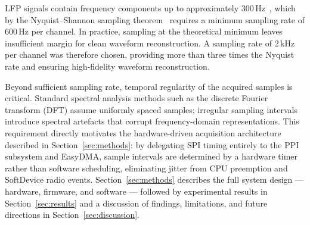 LFP signals contain frequency components up to approximately
300\,Hz~\cite{reimann2013biophysically, thielen2023making}, which by the Nyquist--Shannon
sampling theorem~\cite{shannon1949} requires a minimum sampling rate
of 600\,Hz per channel. In practice, sampling at the theoretical minimum
leaves insufficient margin for clean waveform reconstruction. A sampling
rate of 2\,kHz per channel was therefore chosen, providing more than
three times the Nyquist rate and ensuring high-fidelity waveform
reconstruction.

Beyond sufficient sampling rate, temporal regularity of the acquired
samples is critical. Standard spectral analysis methods such as the
discrete Fourier transform (DFT) assume uniformly spaced samples;
irregular sampling intervals introduce spectral artefacts that corrupt
frequency-domain representations. This requirement directly motivates
the hardware-driven acquisition architecture described in
Section~\ref{sec:methods}: by delegating SPI timing entirely to the
PPI subsystem and EasyDMA, sample intervals are determined by a hardware
timer rather than software scheduling, eliminating jitter from CPU
preemption and SoftDevice radio events. Section~\ref{sec:methods} describes
the full system design --- hardware, firmware, and software --- followed by
experimental results in Section~\ref{sec:results} and a discussion of
findings, limitations, and future directions in Section~\ref{sec:discussion}.
